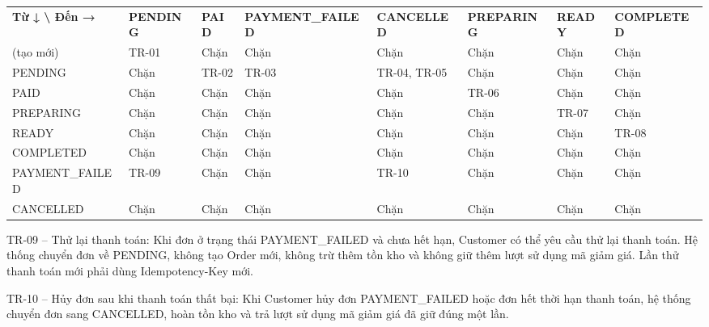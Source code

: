 \documentclass[11pt,a4paper,oneside]{report}
\begin{document}
\begin{landscape}
\begin{longtable}[]{@{}
  >{\raggedright\arraybackslash}p{}
  >{\raggedright\arraybackslash}p{}
  >{\raggedright\arraybackslash}p{}
  >{\raggedright\arraybackslash}p{}
  >{\raggedright\arraybackslash}p{}
  >{\raggedright\arraybackslash}p{}
  >{\raggedright\arraybackslash}p{}
  >{\raggedright\arraybackslash}p{}@{}}
\toprule\noalign{}
\endhead
\bottomrule\noalign{}
\endlastfoot
\textbf{Từ ↓ \textbackslash{} Đến →} & \textbf{PENDING} & \textbf{PAID} & \textbf{PAYMENT\_FAILED} & \textbf{CANCELLED} & \textbf{PREPARING} & \textbf{READY} & \textbf{COMPLETED} \\
(tạo mới) & TR-01 & Chặn & Chặn & Chặn & Chặn & Chặn & Chặn \\
PENDING & Chặn & TR-02 & TR-03 & TR-04, TR-05 & Chặn & Chặn & Chặn \\
PAID & Chặn & Chặn & Chặn & Chặn & TR-06 & Chặn & Chặn \\
PREPARING & Chặn & Chặn & Chặn & Chặn & Chặn & TR-07 & Chặn \\
READY & Chặn & Chặn & Chặn & Chặn & Chặn & Chặn & TR-08 \\
COMPLETED & Chặn & Chặn & Chặn & Chặn & Chặn & Chặn & Chặn \\
PAYMENT\_FAILED & TR-09 & Chặn & Chặn & TR-10 & Chặn & Chặn & Chặn \\
CANCELLED & Chặn & Chặn & Chặn & Chặn & Chặn & Chặn & Chặn \\
\end{longtable}
\end{landscape}

TR-09 -- Thử lại thanh toán: Khi đơn ở trạng thái PAYMENT\_FAILED và chưa hết hạn, Customer có thể yêu cầu thử lại thanh toán. Hệ thống chuyển đơn về PENDING, không tạo Order mới, không trừ thêm tồn kho và không giữ thêm lượt sử dụng mã giảm giá. Lần thử thanh toán mới phải dùng Idempotency-Key mới.

TR-10 -- Hủy đơn sau khi thanh toán thất bại: Khi Customer hủy đơn PAYMENT\_FAILED hoặc đơn hết thời hạn thanh toán, hệ thống chuyển đơn sang CANCELLED, hoàn tồn kho và trả lượt sử dụng mã giảm giá đã giữ đúng một lần.
\end{document}
